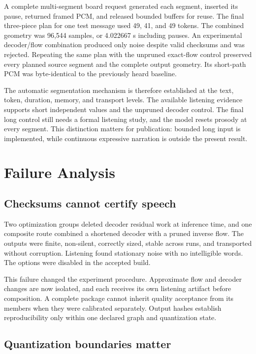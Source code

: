 \documentclass[10pt]{article}
\begin{document}
A complete multi-segment board request generated each segment, inserted its
pause, returned framed PCM, and released bounded buffers for reuse. The final
three-piece plan for one test message used 49, 41, and 49 tokens. The combined
geometry was 96,544 samples, or 4.022667 s including pauses. An experimental
decoder/flow combination produced only noise despite valid checksums and was
rejected. Repeating the same plan with the unpruned exact-flow control preserved
every planned source segment and the complete output geometry. Its short-path
PCM was byte-identical to the previously heard baseline.

The automatic segmentation mechanism is therefore established at the text,
token, duration, memory, and transport levels. The available listening
evidence supports short independent values and the unpruned decoder control.
The final long control still needs a formal listening study, and the model
resets prosody at every segment. This distinction matters for publication:
bounded long input is implemented, while continuous expressive narration is
outside the present result.

\section{Failure Analysis}

\subsection{Checksums cannot certify speech}

Two optimization groups deleted decoder residual work at inference time, and
one composite route combined a shortened decoder with a pruned inverse flow.
The outputs were finite, non-silent, correctly sized, stable across runs, and
transported without corruption. Listening found stationary noise with no
intelligible words. The options were disabled in the accepted build.

This failure changed the experiment procedure. Approximate flow and decoder
changes are now isolated, and each receives its own listening artifact before
composition. A complete package cannot inherit quality acceptance from its
members when they were calibrated separately. Output hashes establish
reproducibility only within one declared graph and quantization state.

\subsection{Quantization boundaries matter}
\end{document}

